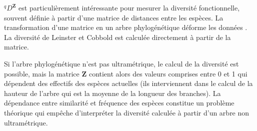 \documentclass[
  11pt,
  french,
  a4paper,
  extrafontsizes,onecolumn,openright
  ]{memoir}
\newenvironment{Shaded}{\begin{snugshade}}{\end{snugshade}}
\newcommand{\CommentTok}[1]{\textcolor[rgb]{0.56,0.35,0.01}{\textit{#1}}}
\newcommand{\ControlFlowTok}[1]{\textcolor[rgb]{0.13,0.29,0.53}{\textbf{#1}}}
\newcommand{\DataTypeTok}[1]{\textcolor[rgb]{0.13,0.29,0.53}{#1}}
\newcommand{\DecValTok}[1]{\textcolor[rgb]{0.00,0.00,0.81}{#1}}
\newcommand{\FloatTok}[1]{\textcolor[rgb]{0.00,0.00,0.81}{#1}}
\newcommand{\KeywordTok}[1]{\textcolor[rgb]{0.13,0.29,0.53}{\textbf{#1}}}
\newcommand{\NormalTok}[1]{#1}
\newcommand{\OperatorTok}[1]{\textcolor[rgb]{0.81,0.36,0.00}{\textbf{#1}}}
\newcommand{\StringTok}[1]{\textcolor[rgb]{0.31,0.60,0.02}{#1}}
\begin{document}
\begin{Shaded}
\end{Shaded}

\normalsize

\(^q\!D^{\mathbf{Z}}\) est particulièrement intéressante pour mesurer la diversité fonctionnelle, souvent définie à partir d'une matrice de distances entre les espèces.
La transformation d'une matrice en un arbre phylogénétique déforme les données \autocite{Pavoine2005a,Podani2006,Podani2007}.
La diversité de Leinster et Cobbold est calculée directement à partir de la matrice.

Si l'arbre phylogénétique n'est pas ultramétrique, le calcul de la diversité est possible, mais la matrice \(\mathbf{Z}\) contient alors des valeurs comprises entre 0 et 1 qui dépendent des effectifs des espèces actuelles (ils interviennent dans le calcul de la hauteur de l'arbre qui est la moyenne de la longueur des branches).
La dépendance entre similarité et fréquence des espèces constitue un problème théorique qui empêche d'interpréter la diversité calculée à partir d'un arbre non ultramétrique.
\end{document}
